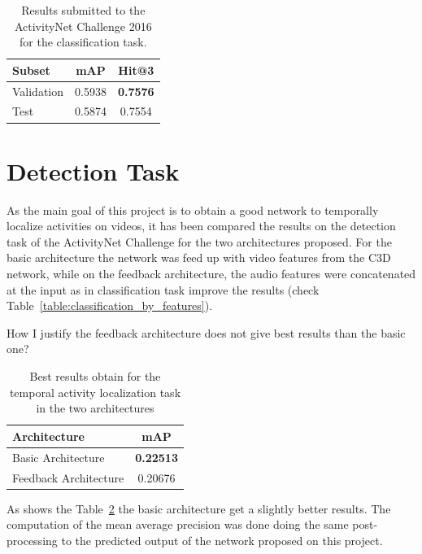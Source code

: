 \begin{table}[H]
\begin{center}
\begin{tabular}{|l|c|c|}
\hline
Subset & mAP & Hit@3 \\
\hline\hline
Validation & 0.5938 & \bf0.7576 \\
Test & 0.5874 & 0.7554 \\
\hline
\end{tabular}
\end{center}
\caption{Results submitted to the ActivityNet Challenge 2016 for the classification task.}
\label{table:classification_results_challenge}
\end{table}



\section{Detection Task}

As the main goal of this project is to obtain a good network to temporally localize activities on videos, it has been compared the results on the detection task of the ActivityNet Challenge for the two architectures proposed. For the basic architecture the network was feed up with video features from the C3D network, while on the feedback architecture, the audio features were concatenated at the input as in classification task improve the results (check Table~\ref{table:classification_by_features}).

How I justify the feedback architecture does not give best results than the basic one?

\begin{table}[H]
\begin{center}
\begin{tabular}{|l|c|}
\hline
Architecture & mAP \\
\hline\hline
Basic Architecture & \bf0.22513 \\
Feedback Architecture & 0.20676 \\
\hline
\end{tabular}
\end{center}
\caption{Best results obtain for the temporal activity localization task in the two architectures}
\label{table:detection_architecture_comparison}
\end{table}

As shows the Table~\ref{table:detection_architecture_comparison} the basic architecture get a slightly better results. The computation of the mean average precision was done doing the same post-processing to the predicted output of the network proposed on this project.

